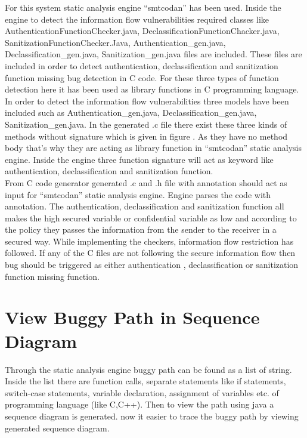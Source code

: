 For this system static analysis engine \enquote{smtcodan}  has been used. Inside the engine to detect the information flow vulnerabilities required classes like AuthenticationFunctionChecker.java, DeclassificationFunctionChacker.java, SanitizationFunctionChecker.Java, Authentication\_gen.java,\\
Declassification\_gen.java,
Sanitization\_gen.java files are included. These files are included in order to detect authentication, declassification and sanitization function missing bug detection in C code. For these three types of function detection here it has been used as library functions in C programming language. In order to detect the information flow vulnerabilities three models have been included such as Authentication\_gen.java,
Declassification\_gen.java,
Sanitization\_gen.java. In the generated .c file there exist these three kinds of methods without signature which is given in figure . As they have no method body that's why they are acting as library function in \enquote{smtcodan} static analysis engine. Inside the engine three function signature will act as keyword like authentication, declassification and sanitization function. \\

From C code generator generated .c and .h file with annotation should act as input for \enquote{smtcodan} static analysis engine. Engine parses the code with annotation. The authentication, declassification and sanitization function all makes the high secured variable or confidential variable as low and according to the policy they passes the information from the sender to the receiver in a secured way. While implementing the checkers, information flow restriction has followed. If any of the C files are not following the secure information flow then bug should be triggered as either authentication , declassification or sanitization function missing function.

\section{View Buggy Path in Sequence Diagram}

Through the static analysis engine buggy path can be found as a list of string. Inside the list there are function calls, separate statements like if statements, switch-case statements, variable declaration, assignment of variables etc. of programming language (like C,C++). Then to view the path using java a sequence diagram is generated.
now it easier to trace the buggy path by viewing generated sequence diagram.

